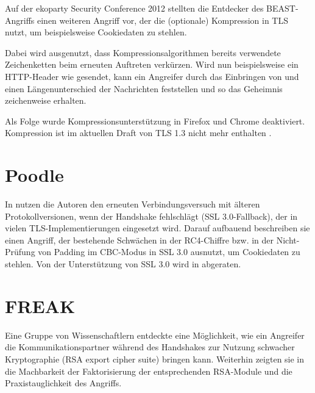 Auf der ekoparty Security Conference 2012 stellten die Entdecker des BEAST-Angriffs einen weiteren Angriff vor, der die (optionale) Kompression in TLS nutzt, um beispielsweise Cookiedaten zu stehlen. 

Dabei wird ausgenutzt, dass Kompressionsalgorithmen bereits verwendete Zeichenketten beim erneuten Auftreten verkürzen. Wird nun beispielsweise ein HTTP-Header wie  gesendet, kann ein Angreifer durch das Einbringen von  und  einen Längenunterschied der Nachrichten feststellen und so das Geheimnis zeichenweise erhalten.

Als Folge wurde Kompressionsunterstützung in Firefox und Chrome deaktiviert. Kompression ist im aktuellen Draft von TLS 1.3 nicht mehr enthalten \cite{tls13}.

\section{Poodle}
\label{sec_attack_poodle}

In \cite{moeller14} nutzen die Autoren den erneuten Verbindungsversuch mit älteren Protokollversionen, wenn der Handshake fehlschlägt (SSL 3.0-Fallback), der in vielen TLS-Implementierungen eingesetzt wird. Darauf aufbauend beschreiben sie einen Angriff, der bestehende Schwächen in der RC4-Chiffre  bzw. in der Nicht-Prüfung von Padding im CBC-Modus in SSL 3.0 ausnutzt, um Cookiedaten zu stehlen.
Von der Unterstützung von SSL 3.0 wird in \cite{deprecate_ssl30} abgeraten.

\section{FREAK}

\label{sec_attack_freak}

Eine Gruppe von Wissenschaftlern entdeckte eine Möglichkeit, wie ein Angreifer die Kommunikationspartner während des Handshakes zur Nutzung schwacher Kryptographie (RSA export cipher suite) bringen kann. Weiterhin zeigten sie in \cite{freak15} die Machbarkeit der Faktorisierung der entsprechenden RSA-Module und die Praxistauglichkeit des Angriffs.

